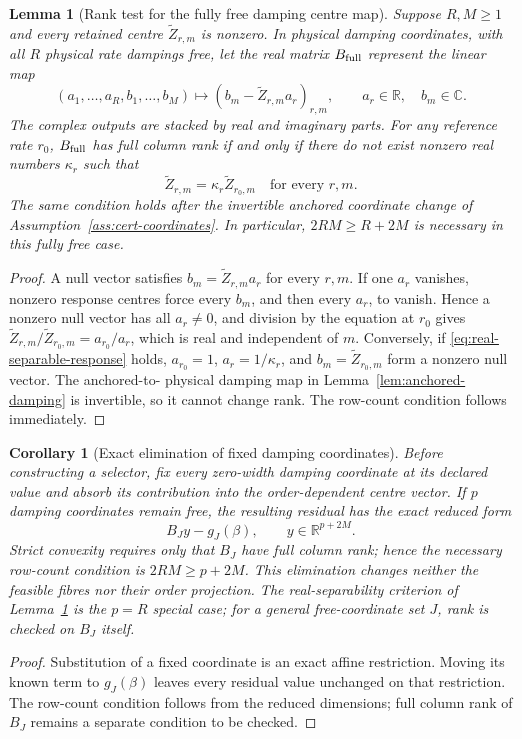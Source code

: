 \documentclass[11pt]{article}
\newtheorem{corollary}[theorem]{Corollary}
\newtheorem{lemma}[theorem]{Lemma}
\theoremstyle{definition}
\theoremstyle{remark}
\newcommand{\C}{\mathbb C}
\newcommand{\R}{\mathbb R}
\begin{document}
\begin{lemma}[Rank test for the fully free damping centre map]
\label{lem:selector-rank}
Suppose \(R,M\ge1\) and every retained centre
\(\widetilde Z_{r,m}\) is nonzero.  In physical
damping coordinates, with all \(R\) physical rate dampings free, let the real
matrix \(B_{\rm full}\) represent the linear map
\[
 (a_1,\ldots,a_R,b_1,\ldots,b_M)\longmapsto
 (b_m-\widetilde Z_{r,m}a_r)_{r,m},
 \qquad a_r\in\R,\quad b_m\in\C.
\]
The complex outputs are stacked by real and imaginary parts.  For any
reference rate \(r_0\), \(B_{\rm full}\) has full column rank if and only if
there do not exist nonzero real numbers \(\kappa_r\) such that
\begin{equation}
 \widetilde Z_{r,m}=\kappa_r\widetilde Z_{r_0,m}
 \quad\text{for every }r,m.
 \label{eq:real-separable-response}
\end{equation}
The same condition holds after the invertible anchored coordinate change of
Assumption~\ref{ass:cert-coordinates}.  In particular,
\(2RM\ge R+2M\) is necessary in this fully free case.
\end{lemma}
\begin{proof}
A null vector satisfies
\(b_m=\widetilde Z_{r,m}a_r\) for every \(r,m\).  If one \(a_r\) vanishes,
nonzero response centres force every \(b_m\), and then every \(a_r\), to
vanish.  Hence a nonzero null vector has all \(a_r\ne0\), and division by the
equation at \(r_0\) gives
\(\widetilde Z_{r,m}/\widetilde Z_{r_0,m}=a_{r_0}/a_r\), which is real and
independent of \(m\).  Conversely, if \eqref{eq:real-separable-response}
holds, \(a_{r_0}=1\), \(a_r=1/\kappa_r\), and
\(b_m=\widetilde Z_{r_0,m}\) form a nonzero null vector.  The anchored-to-
physical damping map in Lemma~\ref{lem:anchored-damping} is invertible, so it
cannot change rank.  The row-count condition follows immediately.
\end{proof}

\begin{corollary}[Exact elimination of fixed damping coordinates]
\label{cor:fixed-coordinate-elimination}
Before constructing a selector, fix every zero-width damping coordinate at its
declared value and absorb its contribution into the order-dependent centre
vector.  If \(p\) damping coordinates remain free, the resulting residual has
the exact reduced form
\[
 B_Jy-g_J(\beta),\qquad y\in\R^{p+2M}.
\]
Strict convexity requires only that \(B_J\) have full column rank; hence the
necessary row-count condition is \(2RM\ge p+2M\).  This elimination changes
neither the feasible fibres nor their order projection.  The real-separability
criterion of Lemma~\ref{lem:selector-rank} is the \(p=R\) special case; for a
general free-coordinate set \(J\), rank is checked on \(B_J\) itself.
\end{corollary}
\begin{proof}
Substitution of a fixed coordinate is an exact affine restriction.  Moving its
known term to \(g_J(\beta)\) leaves every residual value unchanged on that
restriction.  The row-count condition follows from the reduced dimensions;
full column rank of \(B_J\) remains a separate condition to be checked.
\end{proof}
\end{document}
